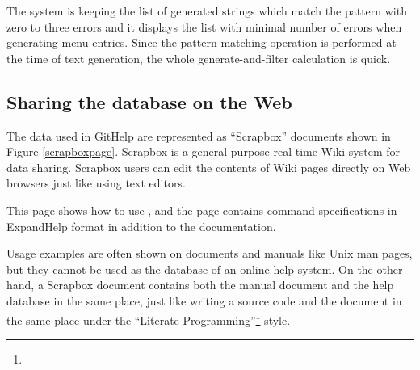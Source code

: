 \documentclass[manuscript,screen,review]{acmart}
\def\GH{\textsf{GitHelp}}
\def\EH{\textsf{ExpandHelp}}
\def\SB{\textsf{Scrapbox}}
\begin{document}
The system is keeping the list of generated strings
which match the pattern with zero to three errors
and it displays the list with minimal number of errors
when generating menu entries.
% 
Since the pattern matching operation is performed at the time of text generation,
the whole generate-and-filter calculation is quick.



\subsection{Sharing the database on the Web}

The data used in {\GH} are represented as ``{\SB}'' documents
shown in Figure \ref{scrapboxpage}.
%
{\SB} is a general-purpose real-time Wiki system for data sharing.
{\SB} users can edit the contents of Wiki pages directly
on Web browsers just like using text editors.


This page shows how to use , and
the page contains command specifications in {\EH} format
in addition to the documentation.


Usage examples are often shown on documents and manuals like Unix man pages,
but they cannot be used as the database of an online help system.
On the other hand,
a {\SB} document contains both the manual document and the help database
in the same place, just like
writing a source code and the document in the same place
under the ``Literate Programming''\footnote{
} style.
\end{document}
